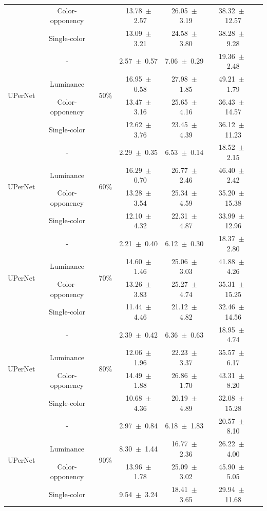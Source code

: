 \begin{table}[h]
\begin{tabular}{@{}lccc ccc@{}}
& Color-opponency & & 13.78~$\pm$~2.57 & 26.05~$\pm$~3.19 & 38.32~$\pm$~12.57 \\
& Single-color & & 13.09~$\pm$~3.21 & 24.58~$\pm$~3.80 & 38.28~$\pm$~9.28 \\
\midrule
\multirow{4}{*}{UPerNet} & - & \multirow{4}{*}{50\%} & 2.57~$\pm$~0.57 & 7.06~$\pm$~0.29 & 19.36~$\pm$~2.48 \\
& Luminance & & 16.95~$\pm$~0.58 & 27.98~$\pm$~1.85 & 49.21~$\pm$~1.79 \\
& Color-opponency & & 13.47~$\pm$~3.16 & 25.65~$\pm$~4.16 & 36.43~$\pm$~14.57 \\
& Single-color & & 12.62~$\pm$~3.76 & 23.45~$\pm$~4.39 & 36.12~$\pm$~11.23 \\
\midrule
\multirow{4}{*}{UPerNet} & - & \multirow{4}{*}{60\%} & 2.29~$\pm$~0.35 & 6.53~$\pm$~0.14 & 18.52~$\pm$~2.15 \\
& Luminance & & 16.29~$\pm$~0.70 & 26.77~$\pm$~2.46 & 46.40~$\pm$~2.42 \\
& Color-opponency & & 13.28~$\pm$~3.54 & 25.34~$\pm$~4.59 & 35.20~$\pm$~15.38 \\
& Single-color & & 12.10~$\pm$~4.32 & 22.31~$\pm$~4.87 & 33.99~$\pm$~12.96 \\
\midrule
\multirow{4}{*}{UPerNet} & - & \multirow{4}{*}{70\%} & 2.21~$\pm$~0.40 & 6.12~$\pm$~0.30 & 18.37~$\pm$~2.80 \\
& Luminance & & 14.60~$\pm$~1.46 & 25.06~$\pm$~3.03 & 41.88~$\pm$~4.26 \\
& Color-opponency & & 13.26~$\pm$~3.83 & 25.27~$\pm$~4.74 & 35.31~$\pm$~15.25 \\
& Single-color & & 11.44~$\pm$~4.46 & 21.12~$\pm$~4.82 & 32.46~$\pm$~14.56 \\
\midrule
\multirow{4}{*}{UPerNet} & - & \multirow{4}{*}{80\%} & 2.39~$\pm$~0.42 & 6.36~$\pm$~0.63 & 18.95~$\pm$~4.74 \\
& Luminance & & 12.06~$\pm$~1.96 & 22.23~$\pm$~3.37 & 35.57~$\pm$~6.17 \\
& Color-opponency & & 14.49~$\pm$~1.88 & 26.86~$\pm$~1.70 & 43.31~$\pm$~8.20 \\
& Single-color & & 10.68~$\pm$~4.36 & 20.19~$\pm$~4.89 & 32.08~$\pm$~15.28 \\
\midrule
\multirow{4}{*}{UPerNet} & - & \multirow{4}{*}{90\%} & 2.97~$\pm$~0.84 & 6.18~$\pm$~1.83 & 20.57~$\pm$~8.10 \\
& Luminance & & 8.30~$\pm$~1.44 & 16.77~$\pm$~2.36 & 26.22~$\pm$~4.00 \\
& Color-opponency & & 13.96~$\pm$~1.78 & 25.09~$\pm$~3.02 & 45.90~$\pm$~5.05 \\
& Single-color & & 9.54~$\pm$~3.24 & 18.41~$\pm$~3.65 & 29.94~$\pm$~11.68 \\
\midrule
\bottomrule
\end{tabular}
\label{tab:sparse_results_upernet_dark_zurich}
\end{table}